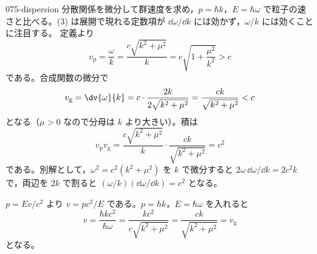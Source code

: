 \documentclass[uplatex,dvipdfmx,a4paper,11pt]{jsarticle}
\begin{document}
\kaitouhen
{}
\begin{kaisetsu}{075-dispersion}
\houshin 分散関係を微分して群速度を求め，$p=\hbar k$，$E=\hbar\omega$ で粒子の速さと比べる。(3) は展開で現れる定数項が $\dd\omega/\dd k$ には効かず，$\omega/k$ には効くことに注目する。
\keisan {} 定義より
\[ v_{\mathrm{p}}=\frac{\omega}{k}=\frac{c\sqrt{k^{2}+\mu^{2}}}{k}=c\sqrt{1+\frac{\mu^{2}}{k^{2}}}>c \]
である。合成関数の微分で
\[ v_{\mathrm{g}}=\dv{\omega}{k}=c\cdot\frac{2k}{2\sqrt{k^{2}+\mu^{2}}}=\frac{ck}{\sqrt{k^{2}+\mu^{2}}}<c \]
となる（$\mu>0$ なので分母は $k$ より大きい）。積は
\[ v_{\mathrm{p}}v_{\mathrm{g}}=\frac{c\sqrt{k^{2}+\mu^{2}}}{k}\cdot\frac{ck}{\sqrt{k^{2}+\mu^{2}}}=c^{2} \]
である。別解として，$\omega^{2}=c^{2}(k^{2}+\mu^{2})$ を $k$ で微分すると $2\omega\,\dd\omega/\dd k=2c^{2}k$ で，両辺を $2k$ で割ると $(\omega/k)(\dd\omega/\dd k)=c^{2}$ となる。

 $p=Ev/c^{2}$ より $v=pc^{2}/E$ である。$p=\hbar k$，$E=\hbar\omega$ を入れると
\[ v=\frac{\hbar kc^{2}}{\hbar\omega}=\frac{kc^{2}}{c\sqrt{k^{2}+\mu^{2}}}=\frac{ck}{\sqrt{k^{2}+\mu^{2}}}=v_{\mathrm{g}} \]
となる。


\end{kaisetsu}
\end{document}
